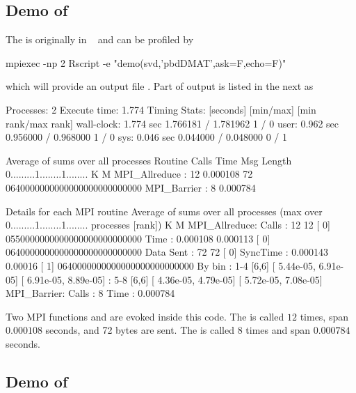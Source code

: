 \subsection{Demo of }

The  is originally in
~\citep{Schmidt2012pbdBASEpackage}
and can be profiled by
\begin{Code}
mpiexec -np 2 Rscript -e "demo(svd,'pbdDMAT',ask=F,echo=F)"
\end{Code}
which will provide an output file .
Part of output is listed in the next as
\begin{Output}
Processes:  2
Execute time:  1.774
Timing Stats: [seconds]	[min/max]    	[min rank/max rank]
wall-clock: 1.774 sec	1.766181 / 1.781962	1 / 0
user: 0.962 sec	0.956000 / 0.968000	1 / 0
sys: 0.046 sec	0.044000 / 0.048000	0 / 1

Average of sums over all processes
Routine                 Calls       Time Msg Length    %
0.........1........1........
K        M
MPI_Allreduce       :      12   0.000108         72 0640000000000000000000000000
MPI_Barrier         :       8   0.000784

Details for each MPI routine
Average of sums over all processes
(max over          0.........1........1........
 processes [rank])           K        M
MPI_Allreduce:
  Calls     :         12           12 [   0] 0550000000000000000000000000
Time      :   0.000108     0.000113 [   0] 0640000000000000000000000000
Data Sent :         72           72 [   0]
SyncTime  :   0.000143      0.00016 [   1] 0640000000000000000000000000
By bin    : 1-4	[6,6]	[  5.44e-05,  6.91e-05]	[  6.91e-05,  8.89e-05]
: 5-8	[6,6]	[  4.36e-05,  4.79e-05]	[  5.72e-05,  7.08e-05]
MPI_Barrier:
  Calls     :          8
Time      :   0.000784

\end{Output}
Two MPI  functions  and  are
evoked inside this  code. The  is called $12$
  times, span $0.000108$ seconds, and 72 bytes are sent.
The  is called $8$ times and span $0.000784$ seconds.



\subsection{Demo of }

